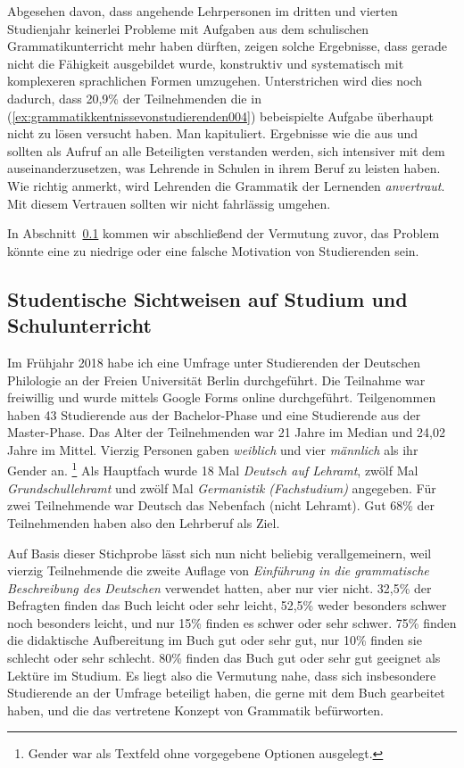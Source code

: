 Abgesehen davon, dass angehende Lehrpersonen im dritten und vierten Studienjahr keinerlei Probleme mit Aufgaben aus dem schulischen Grammatikunterricht mehr haben dürften, zeigen solche Ergebnisse, dass gerade nicht die Fähigkeit ausgebildet wurde, konstruktiv und systematisch mit komplexeren sprachlichen Formen umzugehen.
Unterstrichen wird dies noch dadurch, dass 20,9\% der Teilnehmenden die in (\ref{ex:grammatikkentnissevonstudierenden004}) bebeispielte Aufgabe überhaupt nicht zu lösen versucht haben.
Man kapituliert.
Ergebnisse wie die aus \citet{TopalovicDuenschede2014} und \citet{SchaeferSayatz2017a} sollten als Aufruf an alle Beteiligten verstanden werden, sich intensiver mit dem auseinanderzusetzen, was Lehrende in Schulen in ihrem Beruf zu leisten haben.
Wie \citet[7]{Eisenberg2013c} richtig anmerkt, wird Lehrenden die Grammatik der Lernenden \textit{anvertraut}.
Mit diesem Vertrauen sollten wir nicht fahrlässig umgehen.

In Abschnitt~\ref{sec:studentischesichtweisenaufstudiumundschulunterricht} kommen wir abschließend der Vermutung zuvor, das Problem könnte eine zu niedrige oder eine falsche Motivation von Studierenden sein.


\subsection{Studentische Sichtweisen auf Studium und Schulunterricht}
\label{sec:studentischesichtweisenaufstudiumundschulunterricht}

Im Frühjahr 2018 habe ich eine Umfrage unter Studierenden der Deutschen Philologie an der Freien Universität Berlin durchgeführt.
Die Teilnahme war freiwillig und wurde mittels Google Forms online durchgeführt.
Teilgenommen haben 43 Studierende aus der Bachelor-Phase und eine Studierende aus der Master-Phase.
Das Alter der Teilnehmenden war 21 Jahre im Median und 24,02 Jahre im Mittel.
Vierzig Personen gaben \textit{weiblich} und vier \textit{männlich} als ihr Gender an.%
\footnote{Gender war als Textfeld ohne vorgegebene Optionen ausgelegt.}
Als Hauptfach wurde 18 Mal \textit{Deutsch auf Lehramt}, zwölf Mal \textit{Grundschullehramt} und zwölf Mal \textit{Germanistik (Fachstudium)} angegeben.
Für zwei Teilnehmende war Deutsch das Nebenfach (nicht Lehramt).
Gut 68\% der Teilnehmenden haben also den Lehrberuf als Ziel.

Auf Basis dieser Stichprobe lässt sich nun nicht beliebig verallgemeinern, weil vierzig Teilnehmende die zweite Auflage von \textit{Einführung in die grammatische Beschreibung des Deutschen} verwendet hatten, aber nur vier nicht.
32,5\% der Befragten finden das Buch leicht oder sehr leicht, 52,5\% weder besonders schwer noch besonders leicht, und nur 15\% finden es schwer oder sehr schwer.
75\% finden die didaktische Aufbereitung im Buch gut oder sehr gut, nur 10\% finden sie schlecht oder sehr schlecht.
80\% finden das Buch gut oder sehr gut geeignet als Lektüre im Studium.
Es liegt also die Vermutung nahe, dass sich insbesondere Studierende an der Umfrage beteiligt haben, die gerne mit dem Buch gearbeitet haben, und die das vertretene Konzept von Grammatik befürworten.

